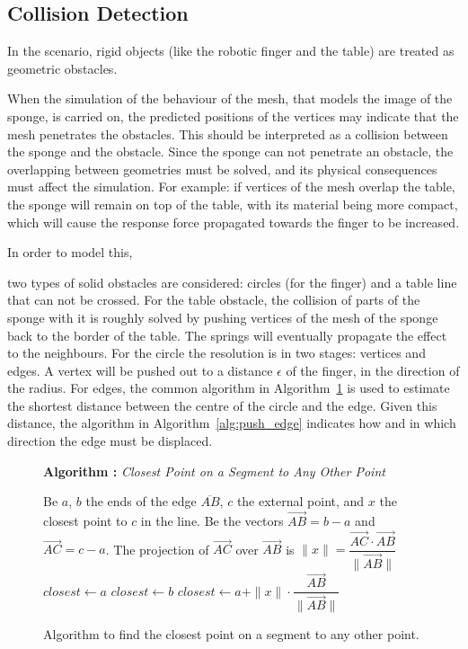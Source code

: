 \documentclass[journal]{IEEEtran}
\newcommand{\alref}[1]{Algorithm~\ref{#1}}
\newcounter{algorithm}
\newenvironment{algorithmicieee}[1]
  {\refstepcounter{algorithm}
   \begin{lrbox}{\ieeealgbox}
   \begin{minipage}{\dimexpr\columnwidth-2\fboxsep-2\fboxrule}
   \textbf{Algorithm \arabic{algorithm}:} \textit{#1} \par
   \begin{algorithmic}[1]}
  {\end{algorithmic}
   \end{minipage}
   \end{lrbox}\noindent\fbox{\usebox{\ieeealgbox}}}
\newcommand{\comment}[1]{{\color{red} #1}}
\begin{document}
\subsection{Collision Detection}
In the scenario, rigid objects \comment{(like the robotic finger and the table)} are treated as geometric obstacles.  \comment{When the simulation of the behaviour of the mesh, that models the image of the sponge, is carried on, the predicted positions of the vertices may indicate that the mesh penetrates the obstacles.  This should be interpreted as a collision between the sponge and the obstacle.  Since the sponge can not penetrate an obstacle, the overlapping between geometries must be solved, and its physical consequences must affect the simulation.  For example: if vertices of the mesh overlap the table, the sponge will remain on top of the table, with its material being more compact, which will cause the response force propagated towards the finger to be increased.

In order to model this,} two types of \comment{solid} obstacles are considered: circles \comment{(for the finger)} and a table line that can not be crossed.  For the table obstacle, the collision \comment{of parts of the sponge with it} is roughly solved by pushing vertices \comment{of the mesh of the sponge} back to the border of the table.  The springs will eventually propagate the effect to the neighbours.  For the circle the resolution is in two stages: vertices and edges.  A vertex will be pushed out to a distance $\epsilon$ of the finger, in the direction of the radius.  For edges, the common algorithm in \alref{alg:point_segment} is used to estimate the shortest distance between the centre of the circle and the edge.  Given this distance, the algorithm in \alref{alg:push_edge} indicates how and in which direction the edge must be displaced.

\begin{figure}
  \begin{algorithmicieee}{Closest Point on a Segment to Any Other Point}\label{alg:point_segment}
 \STATE Be $a$, $b$ the ends of the edge $\overline{AB}$, $c$ the external point, and $x$ the closest point to $c$ in the line.
 \STATE Be the vectors $\vec{AB} = b - a$ and $\vec{AC} = c - a$.
 \STATE The projection of $\vec{AC}$ over $\vec{AB}$ is $\|x\| = \dfrac{\vec{AC} \cdot \vec{AB}}{\|\vec{AB}\|}$
  \STATE $closest \gets a$
 \ELSE
   \STATE $closest \gets b$
  \ELSE
   \STATE $closest \gets a + \|x\| \cdot \dfrac{\vec{AB}}{\|\vec{AB}\|}$
  \ENDIF
 \ENDIF
 \end{algorithmicieee}
 \caption{Algorithm to find the closest point on a segment to any other point.}
\end{figure}
\end{document}
